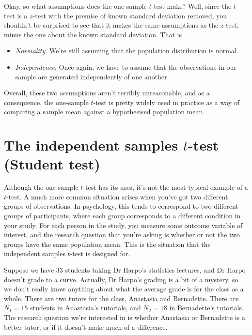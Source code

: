 \documentclass[
]{book}
\providecommand{\tightlist}{%
  \setlength{\itemsep}{0pt}\setlength{\parskip}{0pt}}
\theoremstyle{definition}
\theoremstyle{definition}
\theoremstyle{definition}
\theoremstyle{definition}
\theoremstyle{remark}
\begin{document}
Okay, so what assumptions does the one-sample \(t\)-test make? Well, since the \(t\)-test is a \(z\)-test with the premise of known standard deviation removed, you shouldn't be surprised to see that it makes the same assumptions as the \(z\)-test, minus the one about the known standard deviation. That is

\begin{itemize}
\tightlist
\item
  \emph{Normality}. We're still assuming that the population distribution is normal.
\item
  \emph{Independence}. Once again, we have to assume that the observations in our sample are generated independently of one another.
\end{itemize}

Overall, these two assumptions aren't terribly unreasonable, and as a consequence, the one-sample \(t\)-test is pretty widely used in practice as a way of comparing a sample mean against a hypothesised population mean.

\hypertarget{studentttest}{%
\section{\texorpdfstring{The independent samples \(t\)-test (Student test)}{The independent samples t-test (Student test)}}\label{studentttest}}

Although the one-sample \(t\)-test has its uses, it's not the most typical example of a \(t\)-test. A much more common situation arises when you've got two different groups of observations. In psychology, this tends to correspond to two different groups of participants, where each group corresponds to a different condition in your study. For each person in the study, you measure some outcome variable of interest, and the research question that you're asking is whether or not the two groups have the same population mean. This is the situation that the independent samples \(t\)-test is designed for.

Suppose we have 33 students taking Dr Harpo's statistics lectures, and Dr Harpo doesn't grade to a curve. Actually, Dr Harpo's grading is a bit of a mystery, so we don't really know anything about what the average grade is for the class as a whole. There are two tutors for the class, Anastasia and Bernadette. There are \(N_1 = 15\) students in Anastasia's tutorials, and \(N_2 = 18\) in Bernadette's tutorials. The research question we're interested in is whether Anastasia or Bernadette is a better tutor, or if it doesn't make much of a difference.
\end{document}
